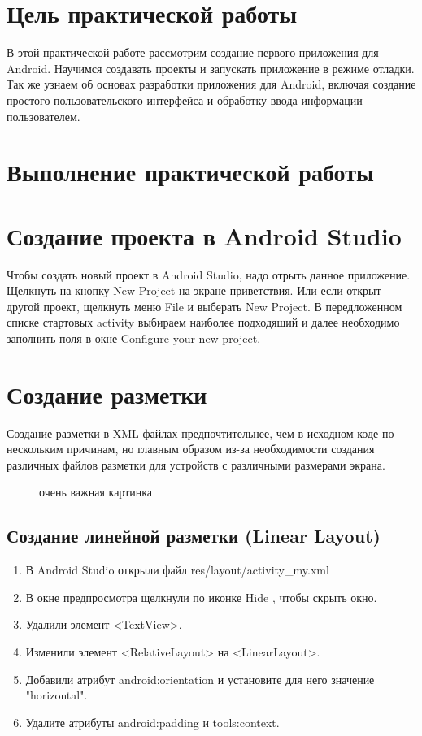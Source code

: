 \section*{\LARGE{Цель практической работы}}
В этой практической работе рассмотрим создание первого приложения для Android.
Научимся создавать проекты и запускать приложение в режиме отладки.
Так же узнаем об основах разработки приложения для Android,
включая создание простого пользовательского интерфейса и обработку ввода информации пользователем.

\newpage

\section*{\LARGE{Выполнение практической работы}}

\section{Создание проекта в Android Studio}
Чтобы создать новый проект в Android Studio, надо отрыть данное приложение.
Щелкнуть на кнопку New Project на экране приветствия. Или если открыт другой проект, щелкнуть меню File и выберать New Project.
В передложенном списке стартовых activity выбираем наиболее подходящий и далее необходимо заполнить поля в окне Configure your new project.

\section{Создание разметки}
Создание разметки в XML файлах предпочтительнее, чем в исходном коде по нескольким причинам, 
но главным образом из-за необходимости создания различных файлов разметки для устройств с различными размерами экрана.

\begin{figure}[hp]
  \begin{center}
    \caption{очень важная картинка}
    \label{fig:}
  \end{center}
\end{figure}

\subsection{Создание линейной разметки (Linear Layout)}
\begin{enumerate}
	\item В Android Studio открыли файл res/layout/activity\_my.xml
	\item В окне предпросмотра щелкнули по иконке Hide , чтобы скрыть окно.
	\item Удалили элемент <TextView>.
	\item Изменили элемент <RelativeLayout> на <LinearLayout>.
	\item Добавили атрибут android:orientation и установите для него значение "horizontal".
	\item Удалите атрибуты android:padding и tools:context.
\end{enumerate}


